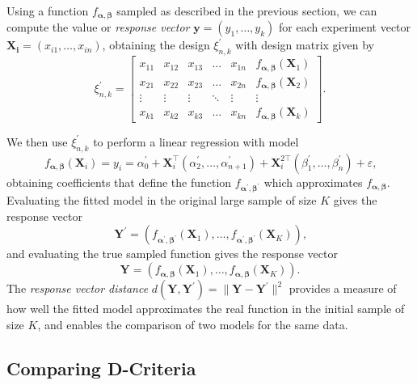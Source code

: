\documentclass[11pt]{article}
\begin{document}
Using a function \(f_{\boldsymbol{\alpha},\boldsymbol{\beta}}\) sampled as
described in the previous section, we can compute the value or \emph{response vector}
\(\boldsymbol{y} = (y_1,\dots,y_k)\) for each experiment vector \(\boldsymbol{X_i}
= (x_{i1},\dots,x_{in})\), obtaining the design \(\xi^{\prime}_{n,k}\) with design
matrix given by
\[
\xi^{\prime}_{n,k} =
\begin{bmatrix}
    x_{11} & x_{12} & x_{13} & \dots  & x_{1n} & f_{\boldsymbol{\alpha},\boldsymbol{\beta}}(\boldsymbol{X}_1) \\
    x_{21} & x_{22} & x_{23} & \dots  & x_{2n} & f_{\boldsymbol{\alpha},\boldsymbol{\beta}}(\boldsymbol{X}_2)\\
    \vdots & \vdots & \vdots & \ddots & \vdots & \vdots \\
    x_{k1} & x_{k2} & x_{k3} & \dots  & x_{kn} & f_{\boldsymbol{\alpha},\boldsymbol{\beta}}(\boldsymbol{X}_k)
\end{bmatrix}.
\]

We then use \(\xi^{\prime}_{n,k}\) to perform a linear regression with model
\[
f_{\boldsymbol{\alpha},\boldsymbol{\beta}}(\boldsymbol{X}_i) = y_i = \alpha^{\prime}_0 +
\boldsymbol{X}_i^{\top}(\alpha^{\prime}_{2}, \dots, \alpha^{\prime}_{n + 1}) +
\boldsymbol{X}^{2\top}_i(\beta^{\prime}_{1}, \dots, \beta^{\prime}_{n}) +
\varepsilon\text{,}
\]
obtaining coefficients that define the function
\(f_{\boldsymbol{\alpha}^{\prime},\boldsymbol{\beta}^{\prime}}\) which
approximates \(f_{\boldsymbol{\alpha},\boldsymbol{\beta}}\).
Evaluating the fitted model in the original large sample of size \(K\) gives
the response vector
\[
\boldsymbol{Y}^{\prime} = (f_{\boldsymbol{\alpha}^{\prime},\boldsymbol{\beta}^{\prime}}
(\boldsymbol{X}_1), \dots, f_{\boldsymbol{\alpha}^{\prime},\boldsymbol{\beta}^{\prime}}
(\boldsymbol{X}_K))\text{,}
\]
and evaluating the true sampled function gives the response vector
\[
\boldsymbol{Y} = (f_{\boldsymbol{\alpha},\boldsymbol{\beta}}
(\boldsymbol{X}_1), \dots, f_{\boldsymbol{\alpha},\boldsymbol{\beta}}
(\boldsymbol{X}_K))\text{.}
\]
The \emph{response vector distance} \(d(\mathbf{Y}, \mathbf{Y}^{\prime}) =
\|\mathbf{Y} - \mathbf{Y}^{\prime}\|^{2}\) provides a measure of how well the
fitted model approximates the real function in the initial sample of size \(K\),
and enables the comparison of two models for the same data.
\subsection{Comparing D-Criteria}
\label{sec:org6a12b5e}
\end{document}
